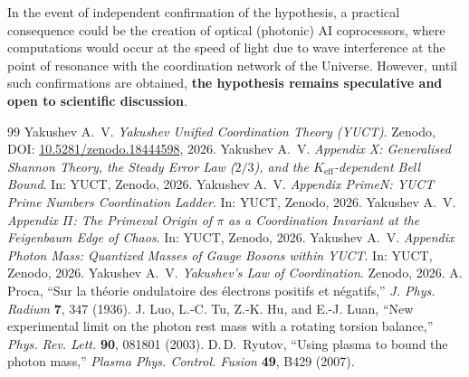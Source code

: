 \documentclass[11pt,a4paper]{article}
\begin{document}
	In the event of independent confirmation of the hypothesis, a practical consequence could be the creation of optical (photonic) AI coprocessors, where computations would occur at the speed of light due to wave interference at the point of resonance with the coordination network of the Universe. However, until such confirmations are obtained, \textbf{the hypothesis remains speculative and open to scientific discussion}.
	
	\begin{thebibliography}{99}
		Yakushev A.~V. \emph{Yakushev Unified Coordination Theory (YUCT)}. Zenodo, DOI: \href{https://doi.org/10.5281/zenodo.18444598}{10.5281/zenodo.18444598}, 2026.
		Yakushev A.~V. \emph{Appendix X: Generalised Shannon Theory, the Steady Error Law ($2/3$), and the $K_{\mathrm{eff}}$-dependent Bell Bound}. In: YUCT, Zenodo, 2026.
		Yakushev A.~V. \emph{Appendix PrimeN: YUCT Prime Numbers Coordination Ladder}. In: YUCT, Zenodo, 2026.
		Yakushev A.~V. \emph{Appendix $\Pi$: The Primeval Origin of $\pi$ as a Coordination Invariant at the Feigenbaum Edge of Chaos}. In: YUCT, Zenodo, 2026.
		Yakushev A.~V. \emph{Appendix Photon Mass: Quantized Masses of Gauge Bosons within YUCT}. In: YUCT, Zenodo, 2026.
		Yakushev A.~V. \emph{Yakushev's Law of Coordination}. Zenodo, 2026.
		A. Proca, ``Sur la théorie ondulatoire des électrons positifs et négatifs,'' \emph{J. Phys. Radium} \textbf{7}, 347 (1936).
		J. Luo, L.-C. Tu, Z.-K. Hu, and E.-J. Luan, ``New experimental limit on the photon rest mass with a rotating torsion balance,'' \emph{Phys. Rev. Lett.} \textbf{90}, 081801 (2003).
		D.\,D.\ Ryutov, ``Using plasma to bound the photon mass,'' \emph{Plasma Phys. Control. Fusion} \textbf{49}, B429 (2007).
	\end{thebibliography}
	
\end{document}
